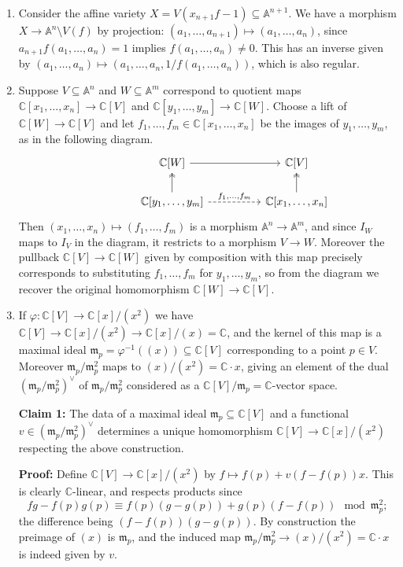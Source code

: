 \documentclass{article}
\theoremstyle{definition}
\newcommand{\m}{\mathfrak{m}}
\newcommand{\A}{\mathbb{A}}
\newcommand{\C}{\mathbb{C}}
\begin{document}
\begin{enumerate}
\begin{enumerate}[label=(\alph*)]
\end{enumerate}

\item
Consider the affine variety $X=V(x_{n+1}f-1)\subseteq\A^{n+1}$. We have a
morphism $X\to\A^n\setminus V(f)$ by projection:
$(a_1,\ldots,a_{n+1})\mapsto(a_1,\ldots,a_n)$, since
$a_{n+1}f(a_1,\ldots,a_n)=1$ implies $f(a_1,\ldots,a_n)\ne0$. This has an
inverse given by $(a_1,\ldots,a_n)\mapsto(a_1,\ldots,a_n,1/f(a_1,\ldots,a_n))$,
which is also regular.

\item
Suppose $V\subseteq\A^n$ and $W\subseteq\A^m$ correspond to quotient maps
$\C[x_1,\ldots,x_n]\to\C[V]$ and $\C[y_1,\ldots,y_m]\to\C[W]$. Choose a
lift of $\C[W]\to\C[V]$ and let $f_1,\ldots,f_m\in\C[x_1,\ldots,x_n]$
be the images of $y_1,\ldots,y_m$, as in the following diagram.
\begin{equation*}
\begin{tikzcd}[column sep=huge]
    &\C[W] \ar[r] &\C[V] \\
    &\C[y_1,\ldots,y_m] \ar[u,two heads] \ar[r,dashed,"f_1{,}\ldots{,}f_m"]
    &\C[x_1,\ldots,x_n] \ar[u,two heads]
\end{tikzcd}
\end{equation*}
Then $(x_1,\ldots,x_n)\mapsto(f_1,\ldots,f_m)$ is a morphism $\A^n\to\A^m$, and
since $I_W$ maps to $I_V$ in the diagram, it restricts to a morphism $V\to W$.
Moreover the pullback $\C[V]\to\C[W]$ given by composition with this map
precisely corresponds to substituting $f_1,\ldots,f_m$ for $y_1,\ldots,y_m$, so
from the diagram we recover the original homomorphism $\C[W]\to\C[V]$.

\item
If $\varphi:\C[V]\to\C[x]/(x^2)$ we have $\C[V]\to\C[x]/(x^2)\to\C[x]/(x)=\C$,
and the kernel of this map is a maximal ideal
$\m_p=\varphi^{-1}((x))\subseteq\C[V]$ corresponding to a point $p\in V$.
Moreover $\m_p/\m_p^2$ maps to $(x)/(x^2)=\C\cdot x$, giving an element of the
dual $(\m_p/\m_p^2)^\vee$ of $\m_p/\m_p^2$ considered as a
$\C[V]/\m_p=\C$-vector space.

\textbf{Claim 1:}
The data of a maximal ideal $\m_p\subseteq\C[V]$ and a functional
$v\in(\m_p/\m_p^2)^\vee$ determines a unique homomorphism $\C[V]\to\C[x]/(x^2)$
respecting the above construction.

\textbf{Proof:}
Define $\C[V]\to\C[x]/(x^2)$ by $f\mapsto f(p)+v(f-f(p))x$. This is clearly
$\C$-linear, and respects products since
\begin{equation*}
    fg-f(p)g(p) \equiv f(p)(g-g(p)) + g(p)(f-f(p)) \mod \m_p^2;
\end{equation*}
the difference being $(f-f(p))(g-g(p))$. By construction the preimage of $(x)$
is $\m_p$, and the induced map $\m_p/\m_p^2\to(x)/(x^2)=\C\cdot x$ is indeed
given by $v$.


\end{enumerate}
\end{document}
